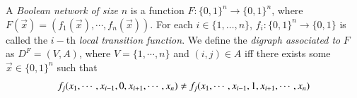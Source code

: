 \documentclass[preprint,12pt]{elsarticle}
\begin{document}

A \textit{Boolean network} \textit{of size} $n$ is %
a function $F:\{0,1\}^n\rightarrow\{0,1\}^n$, where $F(\vec{x})=(f_1(\vec{x}),\cdots,f_n(\vec{x}))$. For each $i \in \{1,\ldots,n\}$, $f_i:\{0,1\}^n\rightarrow\{0,1\}$ is called the $i-$th \textit{local transition function}. %
We define the \textit{digraph associated to }$F$ as $D^F=(V,A)$, where %
$V=\{1,\cdots,n\}$ and $(i,j) \in A$ iff there exists some $\vec{x} \in \{0,1\}^n$ such that
$$f_j(x_1,\cdots,x_{i-1},0,x_{i+1},\cdots,x_n)\neq \\f_j(x_1,\cdots,x_{i-1},1,x_{i+1},\cdots,x_n)$$

\end{document}
